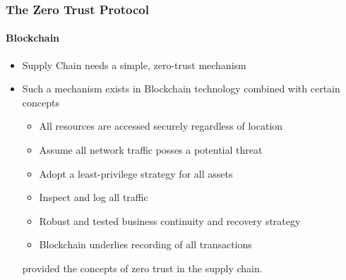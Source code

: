 \begin{frame}
  \frametitle{The Zero Trust Protocol}
  \framesubtitle{Blockchain}
  \begin{itemize}
    \item <1-> Supply Chain needs a simple, zero-trust mechanism
    \item <2-> Such a mechanism exists in Blockchain technology combined with certain concepts
          \begin{itemize}

            \item All resources are accessed securely regardless of location
            \item Assume all network traffic posses a potential threat
            \item Adopt a least-privilege strategy for all assets
            \item Inspect and log all traffic
            \item Robust and tested business continuity and recovery strategy
            \item Blockchain underlies recording of all transactions
          \end{itemize}

           {\scriptsize{\textcite{collierZeroTrustSupply2021} provided the concepts of zero trust in the supply chain.}}

  \end{itemize}
\end{frame}
